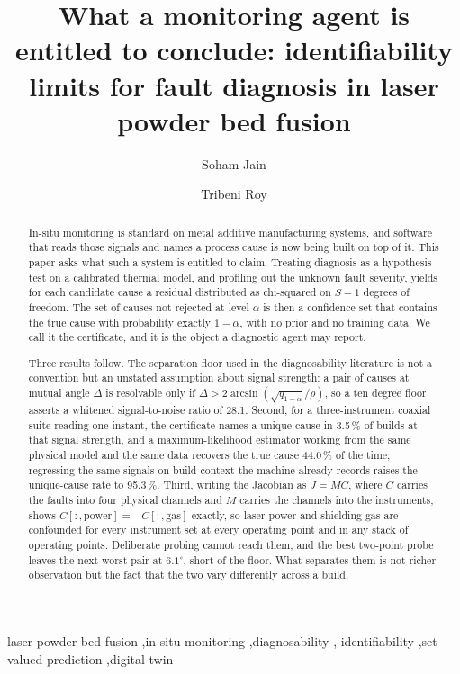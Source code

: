 \documentclass[preprint,12pt]{elsarticle}
\begin{document}
\begin{frontmatter}

\title{What a monitoring agent is entitled to conclude: identifiability limits
for fault diagnosis in laser powder bed fusion}

\author[a]{Soham Jain}
\author[a]{Tribeni Roy}

\begin{abstract}
In-situ monitoring is standard on metal additive manufacturing systems, and
software that reads those signals and names a process cause is now being built
on top of it. This paper asks what such a system is entitled to claim. Treating
diagnosis as a hypothesis test on a calibrated thermal model, and profiling out
the unknown fault severity, yields for each candidate cause a residual
distributed as chi-squared on $S-1$ degrees of freedom. The set of causes not
rejected at level $\alpha$ is then a confidence set that contains the true cause
with probability exactly $1-\alpha$, with no prior and no training data. We call
it the certificate, and it is the object a diagnostic agent may report.

Three results follow. The separation floor used in the diagnosability literature
is not a convention but an unstated assumption about signal strength: a pair of
causes at mutual angle $\Delta$ is resolvable only if
$\Delta > 2\arcsin(\sqrt{q_{1-\alpha}}/\rho)$, so a ten degree floor asserts a
whitened signal-to-noise ratio of 28.1. Second, for a three-instrument coaxial
suite reading one instant, the certificate names a unique cause in 3.5\,\% of
builds at that signal strength, and a maximum-likelihood estimator working from
the same physical model and the same data recovers the true cause 44.0\,\% of
the time; regressing the same signals on build context the machine already
records raises the unique-cause rate to 95.3\,\%. Third, writing the Jacobian as
$J = MC$, where $C$ carries the faults into four physical channels and $M$
carries the channels into the instruments, shows
$C[:,\mathrm{power}] = -C[:,\mathrm{gas}]$ exactly, so laser power and shielding
gas are confounded for every instrument set at every operating point and in any
stack of operating points. Deliberate probing cannot reach them, and the best
two-point probe leaves the next-worst pair at $6.1^\circ$, short of the floor.
What separates them is not richer observation but the fact that the two vary
differently across a build.
\end{abstract}

\begin{keyword}
laser powder bed fusion \sep in-situ monitoring \sep diagnosability \sep
identifiability \sep set-valued prediction \sep digital twin
\end{keyword}

\end{frontmatter}
\end{document}
